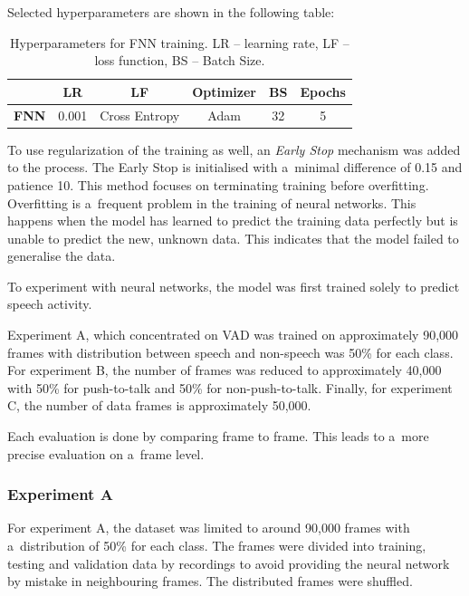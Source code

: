     Selected hyperparameters are shown in the following table:
    
    \begin{table}[!h]
    \begin{center}
    \begin{tabular}{|c|c|c|c|c|c|}\hline 
        & \textbf{LR} & \textbf{LF} & \textbf{Optimizer} & \textbf{BS} & \textbf{Epochs} \\ \hline
        \textbf{FNN} & 0.001 & Cross Entropy & Adam & 32 & 5 \\ \hline
    \end{tabular}
    \caption{Hyperparameters for FNN training. LR – learning rate, LF – loss function, BS – Batch Size.}
    \label{tableparameters}
    \end{center}
    \end{table}

    To use regularization of the training as well, an \textit{Early Stop} mechanism was added to the process. The Early Stop is initialised with a~minimal difference of 0.15 and patience 10. This method focuses on terminating training before overfitting. Overfitting is a~frequent problem in the training of neural networks. This happens when the model has learned to predict the training data perfectly but is unable to predict the new, unknown data. This indicates that the model failed to generalise the data. 
    
    To experiment with neural networks, the model was first trained solely to predict speech activity. 

    Experiment A, which concentrated on VAD was trained on approximately 90,000 frames with distribution between speech and non-speech was 50\% for each class. For experiment B, the number of frames was reduced to approximately 40,000 with 50\% for push-to-talk and 50\% for non-push-to-talk. Finally, for experiment C, the number of data frames is approximately 50,000. 

    Each evaluation is done by comparing frame to frame. This leads to a~more precise evaluation on a~frame level.

    \newpage
    \subsubsection{Experiment A}\label{expA}

    For experiment A, the dataset was limited to around 90,000 frames with a~distribution of 50\% for each class. The frames were divided into training, testing and validation data by recordings to avoid providing the neural network by mistake in neighbouring frames. The distributed frames were shuffled.

